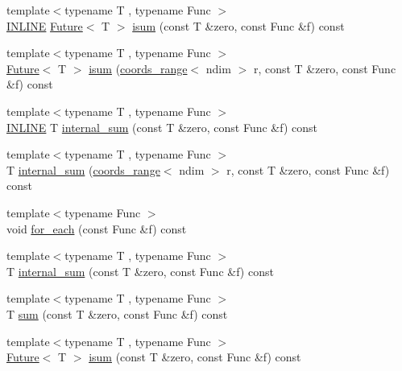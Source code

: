 \begin{DoxyCompactItemize}
\item 
{\footnotesize template$<$typename T , typename Func $>$ }\\\hyperlink{common_8hpp_a2eb6f9e0395b47b8d5e3eeae4fe0c116}{I\+N\+L\+I\+NE} \hyperlink{structshark_1_1_future}{Future}$<$ T $>$ \hyperlink{classshark_1_1ndim_1_1_domain_ab00f61852f9957c033d36ddb2f49f0eb}{isum} (const T \&zero, const Func \&f) const
\item 
{\footnotesize template$<$typename T , typename Func $>$ }\\\hyperlink{structshark_1_1_future}{Future}$<$ T $>$ \hyperlink{classshark_1_1ndim_1_1_domain_a5bf4e150338d25522399b4e63c908144}{isum} (\hyperlink{structshark_1_1ndim_1_1coords__range}{coords\+\_\+range}$<$ ndim $>$ r, const T \&zero, const Func \&f) const
\item 
{\footnotesize template$<$typename T , typename Func $>$ }\\\hyperlink{common_8hpp_a2eb6f9e0395b47b8d5e3eeae4fe0c116}{I\+N\+L\+I\+NE} T \hyperlink{classshark_1_1ndim_1_1_domain_ae6b753c7b16ffd14e6247d4b00c92d35}{internal\+\_\+sum} (const T \&zero, const Func \&f) const
\item 
{\footnotesize template$<$typename T , typename Func $>$ }\\T \hyperlink{classshark_1_1ndim_1_1_domain_aa2e13e2bbd97d87cc3c64ce8017fd430}{internal\+\_\+sum} (\hyperlink{structshark_1_1ndim_1_1coords__range}{coords\+\_\+range}$<$ ndim $>$ r, const T \&zero, const Func \&f) const
\item 
{\footnotesize template$<$typename Func $>$ }\\void \hyperlink{classshark_1_1ndim_1_1_domain_ad27f4f2dfd613d8c50e0d29ff93bb8e6}{for\+\_\+each} (const Func \&f) const
\item 
{\footnotesize template$<$typename T , typename Func $>$ }\\T \hyperlink{classshark_1_1ndim_1_1_domain_ad20744022f33cbcb5bd0af12d82cf7c7}{internal\+\_\+sum} (const T \&zero, const Func \&f) const
\item 
{\footnotesize template$<$typename T , typename Func $>$ }\\T \hyperlink{classshark_1_1ndim_1_1_domain_abe9e94aa18d934b151db4db18b42f7cc}{sum} (const T \&zero, const Func \&f) const
\item 
{\footnotesize template$<$typename T , typename Func $>$ }\\\hyperlink{structshark_1_1_future}{Future}$<$ T $>$ \hyperlink{classshark_1_1ndim_1_1_domain_a9de68dd8f3cbf57cc23a6ddf1c58d569}{isum} (const T \&zero, const Func \&f) const
\end{DoxyCompactItemize}
